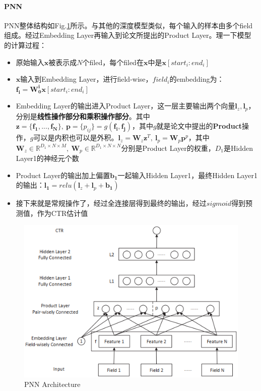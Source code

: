 \paragraph{PNN}
PNN整体结构如Fig.\ref{fig:pnn}所示。与其他的深度模型类似，每个输入的样本由多个field组成。经过Embedding Layer再输入到论文所提出的Product Layer。理一下模型的计算过程：
\begin{itemize}
	\item 原始输入$\boldsymbol{x}$被表示成$N$个filed，每个filed在$\boldsymbol{x}$中是$\boldsymbol{x}[start_i: end_i]$
	\item $\boldsymbol{x}$输入到Embedding Layer，进行field-wise，$field_i$的embedding为：$\boldsymbol{f_i} =\boldsymbol{W_0^i}\boldsymbol{x}[start_i: end_i]$
	\item Embedding Layer的输出进入Product Layer，这一层主要输出两个向量$\boldsymbol{l}_z, \boldsymbol{l}_p$，分别是\textbf{线性操作部分和乘积操作部分}。其中$\boldsymbol{z} = \{\boldsymbol{f_1}, ..., \boldsymbol{f_N}\},\: \boldsymbol{p} = \{p_{ij}\} = g(\boldsymbol{f_i}, \boldsymbol{f_j})$，其中$g$就是论文中提出的\textbf{Product}操作，$g$可以是内积也可以是外积。$\boldsymbol{l}_z = \boldsymbol{W}_z \boldsymbol{z}^T,\: \boldsymbol{l}_p = \boldsymbol{W}_p \boldsymbol{p}^p$，其中$\boldsymbol{W}_z \in \mathbb{R}^{D_1 \times N \times M},\: \boldsymbol{W}_p \in \mathbb{R}^{D_1 \times N \times N}$分别是Product Layer的权重，$D_1$是Hidden Layer1的神经元个数
	\item Product Layer的输出加上偏置$\boldsymbol{b_1}$一起输入Hidden Layer1，最终Hidden Layer1的输出：$\boldsymbol{l_1} = relu(\boldsymbol{l}_z + \boldsymbol{l}_p + \boldsymbol{b_1})$
	\item 接下来就是常规操作了，经过全连接层得到最终的输出，经过$sigmoid$得到预测值，作为CTR估计值
\end{itemize}


\begin{figure}[h]
	\centering
 	\includegraphics[width=.6\textwidth]{pics/pnn.png}
	\caption{PNN Architecture}
	\label{fig:pnn}
\end{figure}



